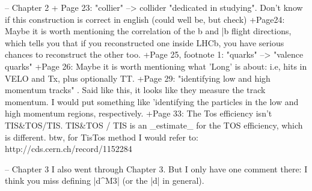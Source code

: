 -- Chapter 2
+ Page 23: "collier" --> collider
"dedicated in studying". Don't know if this construction is correct in english (could well
 be, but check)
+Page24: Maybe it is worth mentioning the correlation of the b and \bar{b} flight directions,
which tells you that if you reconstructed one inside LHCb, you have serious chances to reconstruct
the other too.
+Page 25, footnote 1: "quarks" --> "valence quarks"
+Page 26: Maybe it is worth mentioning what 'Long' is about: i.e, hits in VELO and Tx, plus optionally TT.
+Page 29: "identifying low and high momentum tracks" . Said like this, it looks like they measure
the track momentum. I would put something like 'identifying the particles in the low and high momentum regions, respectively.
+Page 33: The Tos efficiency isn't TIS&TOS/TIS. TIS&TOS / TIS is an _estimate_ for the TOS efficiency,
which is different. btw, for TisTos method I would refer to: http://cds.cern.ch/record/1152284

-- Chapter 3
I also went through Chapter 3. But I only have one comment there:
I think you miss defining |d^{M3}| (or the |d| in general).

